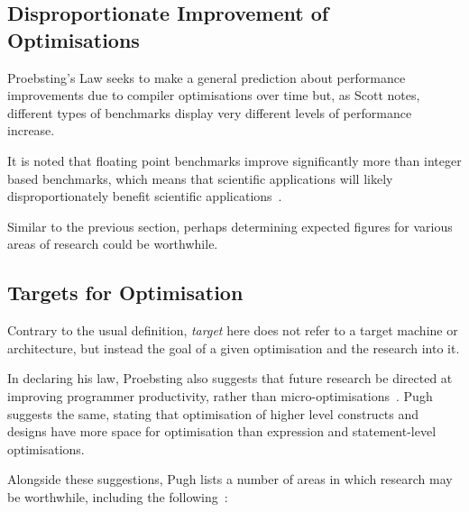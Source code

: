 \subsection{Disproportionate Improvement of Optimisations}

Proebsting's Law seeks to make a general prediction about performance improvements due to compiler optimisations over time but, as Scott notes, different types of benchmarks display very different levels of performance increase.

It is noted that floating point benchmarks improve significantly more than integer based benchmarks, which means that scientific applications will likely disproportionately benefit scientific applications~\cite{proebstingformal}.

Similar to the previous section, perhaps determining expected figures for various areas of research could be worthwhile.

\subsection{Targets for Optimisation}

Contrary to the usual definition, \textit{target} here does not refer to a target machine or architecture, but instead the goal of a given optimisation and the research into it.

In declaring his law, Proebsting also suggests that future research be directed at improving programmer productivity, rather than micro-optimisations~\cite{proebstingdecl}. Pugh suggests the same, stating that optimisation of higher level constructs and designs have more space for optimisation than expression and statement-level optimisations.

Alongside these suggestions, Pugh lists a number of areas in which research may be worthwhile, including the following~\cite{optimisationrelevant}:


